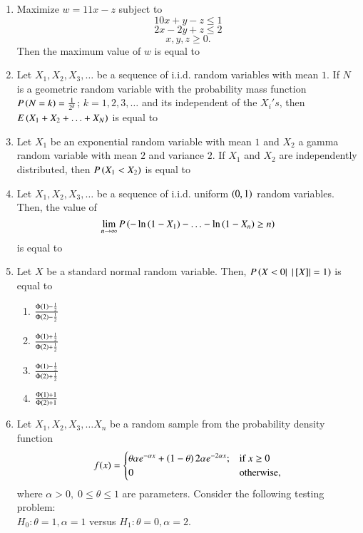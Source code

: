 \documentclass[journal,12pt,onecolumn]{IEEEtran}
\theoremstyle{remark}
\begin{document}
\begin{enumerate}[start=53]
\item Maximize $w=11x-z$ subject to $$10x+y-z\leq 1$$ $$2x-2y+z\leq 2$$ $$x,y,z\geq 0.$$ Then the maximum value of $w$ is equal to \underline{\hspace{2cm}}
\item Let $X_1,X_2,X_3,\ldots$ be a sequence of i.i.d. random variables with mean $1$. If $N$ is a geometric random variable with the probability mass function $P\left(N=k\right)=\frac{1}{2^k}$; $k=1,2,3,\ldots$ and its independent of the $X_i's$, then $E\left(X_1+X_2+\ldots+X_N\right)$ is equal to \underline{\hspace{2cm}}
\item Let $X_1$ be an exponential random variable with mean $1$ and $X_2$ a gamma random variable with mean $2$ and variance $2$. If $X_1$ and $X_2$ are independently distributed, then $P\left(X_1<X_2\right)$ is equal to \underline{\hspace{2cm}}
\item Let $X_1,X_2,X_3,\ldots$ be a sequence of i.i.d. uniform $\left(0,1\right)$ random variables. Then, the value of $$\lim_{n\to \infty}P\left(-\ln{\ensuremath{\left(1-X_1\right)}}-\ldots-\ln{\ensuremath{\left(1-X_n\right)}}\geq n\right)$$ is equal to \underline{\hspace{2cm}}
\item Let $X$ be a standard normal random variable. Then, $P\left(X<0|\;\left\vert{}\left[X\right]\right\vert=1\right)$ is equal to
\begin{enumerate}
    \item $\frac{\Phi\left(1\right)-\frac{1}{2}}{\Phi\left(2\right)-\frac{1}{2}}$
    \item $\frac{\Phi\left(1\right)+\frac{1}{2}}{\Phi\left(2\right)+\frac{1}{2}}$
    \item $\frac{\Phi\left(1\right)-\frac{1}{2}}{\Phi\left(2\right)+\frac{1}{2}}$
    \item $\frac{\Phi\left(1\right)+1}{\Phi\left(2\right)+1}$
\end{enumerate}
\item Let $X_1,X_2,X_3,\ldots X_n$ be a random sample from the probability density function $$f(x) = 
\begin{cases} 
    \theta \alpha e^{-\alpha x}+\left(1-\theta\right)2\alpha e^{-2\alpha x}; & \text{if } x \geq 0 \\
    0 & \text{otherwise,} 
\end{cases}
$$
where $\alpha >0,\; 0\leq \theta \leq 1$ are parameters. Consider the following testing problem:\\
$H_0:\theta =1,\alpha =1$ versus $H_1:\theta=0,\alpha =2.$
\begin{enumerate}

\end{enumerate}
\end{enumerate}
\end{document}
